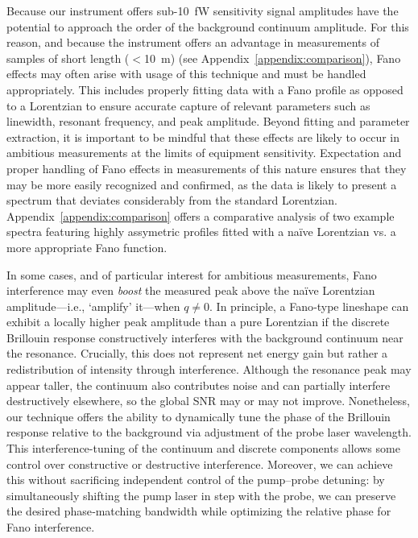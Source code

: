 Because our instrument offers sub-\SI{10}{\femto\watt} sensitivity signal amplitudes have the potential to approach the order of the background continuum amplitude. For this reason, and because the instrument offers an advantage in measurements of samples of short length (\(<\)\SI{10}{m}) (see Appendix~\ref{appendix:comparison}), Fano effects may often arise with usage of this technique and must be handled appropriately. This includes properly fitting data with a Fano profile as opposed to a Lorentzian to ensure accurate capture of relevant parameters such as linewidth, resonant frequency, and peak amplitude. Beyond fitting and parameter extraction, it is important to be mindful that these effects are likely to occur in ambitious measurements at the limits of equipment sensitivity. Expectation and proper handling of Fano effects in measurements of this nature ensures that they may be more easily recognized and confirmed, as the data is likely to present a spectrum that deviates considerably from the standard Lorentzian. Appendix~\ref{appendix:comparison} offers a comparative analysis of two example spectra featuring highly assymetric profiles fitted with a naïve Lorentzian vs. a more appropriate Fano function.

In some cases, and of particular interest for ambitious measurements, Fano interference may even \textit{boost} the measured peak above the naïve Lorentzian amplitude—i.e., ‘amplify’ it—when \(q \neq 0\). In principle, a Fano‐type lineshape can exhibit a locally higher peak amplitude than a pure Lorentzian if the discrete Brillouin response constructively interferes with the background continuum near the resonance. Crucially, this does not represent net energy gain but rather a redistribution of intensity through interference. Although the resonance peak may appear taller, the continuum also contributes noise and can partially interfere destructively elsewhere, so the global \ac{SNR} may or may not improve. Nonetheless, our technique offers the ability to dynamically tune the phase of the Brillouin response relative to the background via adjustment of the probe laser wavelength. This interference-tuning of the continuum and discrete components allows some control over constructive or destructive interference. Moreover, we can achieve this without sacrificing independent control of the pump–probe detuning: by simultaneously shifting the pump laser in step with the probe, we can preserve the desired phase‐matching bandwidth while optimizing the relative phase for Fano interference.

